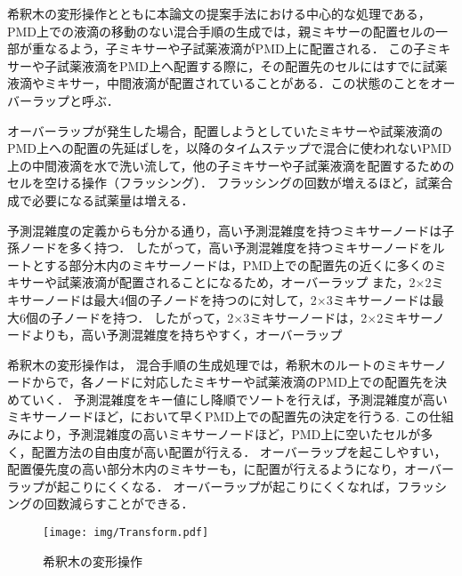 希釈木の変形操作とともに本論文の提案手法における中心的な処理である，PMD上での液滴の移動のない混合手順の生成では，親ミキサーの配置セルの一部が重なるよう，子ミキサーや子試薬液滴がPMD上に配置される．
この子ミキサーや子試薬液滴をPMD上へ配置する際に，その配置先のセルにはすでに試薬液滴やミキサー，中間液滴が配置されていることがある．この状態のことをオーバーラップと呼ぶ．

オーバーラップが発生した場合，配置しようとしていたミキサーや試薬液滴のPMD上への配置の先延ばしを，以降のタイムステップで混合に使われないPMD上の中間液滴を水で洗い流して，他の子ミキサーや子試薬液滴を配置するためのセルを空ける操作（フラッシング）．
フラッシングの回数が増えるほど，試薬合成で必要になる試薬量は増える．

予測混雑度の定義からも分かる通り，高い予測混雑度を持つミキサーノードは子孫ノードを多く持つ．
したがって，高い予測混雑度を持つミキサーノードをルートとする部分木内のミキサーノードは，PMD上での配置先の近くに多くのミキサーや試薬液滴が配置されることになるため，オーバーラップ
また，2$\times$2ミキサーノードは最大4個の子ノードを持つのに対して，2$\times$3ミキサーノードは最大6個の子ノードを持つ．
したがって，2$\times$3ミキサーノードは，2$\times$2ミキサーノードよりも，高い予測混雑度を持ちやすく，オーバーラップ

希釈木の変形操作は，
混合手順の生成処理では，希釈木のルートのミキサーノードからで，各ノードに対応したミキサーや試薬液滴のPMD上での配置先を決めていく．
予測混雑度をキー値にし降順でソートを行えば，予測混雑度が高いミキサーノードほど，において早くPMD上での配置先の決定を行うる.
この仕組みにより，予測混雑度の高いミキサーノードほど，PMD上に空いたセルが多く，配置方法の自由度が高い配置が行える．
オーバーラップを起こしやすい，配置優先度の高い部分木内のミキサーも，に配置が行えるようになり，オーバーラップが起こりにくくなる．
オーバーラップが起こりにくくなれば，フラッシングの回数減らすことができる．

\begin{figure}[tbp]
 \centering\texttt{[image: img/Transform.pdf]}
 \caption{希釈木の変形操作}\label{fig:Transform}
\end{figure}


